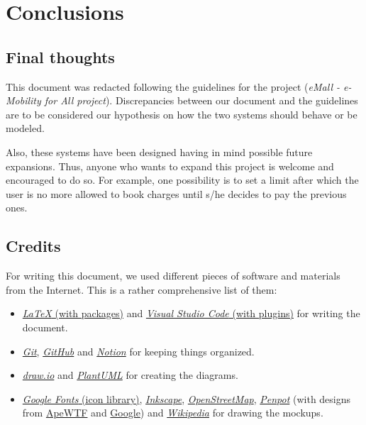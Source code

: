 \chapter{Conclusions} \label{conclusions}

\section{Final thoughts}

This document was redacted following the guidelines for the project (\textit{eMall - e-Mobility for All project}). Discrepancies between our document and the guidelines are to be considered our hypothesis on how the two systems should behave or be modeled.\medskip

Also, these systems have been designed having in mind possible future expansions. Thus, anyone who wants to expand this project is welcome and encouraged to do so. For example, one possibility is to set a limit after which the user is no more allowed to book charges until s/he decides to pay the previous ones.

\section{Credits}

For writing this document, we used different pieces of software and materials from the Internet. This is a rather comprehensive list of them:
\begin{itemize}
    \item \href{https://www.latex-project.org/}{\textit{\LaTeX} (with packages)} and \href{https://code.visualstudio.com/}{\textit{Visual Studio Code} (with plugins)} for writing the document.
    \item \href{https://git-scm.com/}{\textit{Git}}, \href{https://github.com/}{\textit{GitHub}} and \href{https://www.notion.so/}{\textit{Notion}} for keeping things organized.
    \item \href{https://www.diagrams.net/}{\textit{draw.io}} and \href{https://plantuml.com/}{\textit{PlantUML}} for creating the diagrams.
    \item \href{https://fonts.google.com/icons}{\textit{Google Fonts} (icon library)}, \href{https://inkscape.org/}{\textit{Inkscape}}, \href{https://www.openstreetmap.org/}{\textit{OpenStreetMap}}, \href{https://penpot.app/}{\textit{Penpot}} (with designs from \href{https://ape.wtf/}{ApeWTF} and \href{https://design.google/library/designing-material/}{Google}) and \href{https://www.wikipedia.org/}{\textit{Wikipedia}} for drawing the mockups.
\end{itemize}

